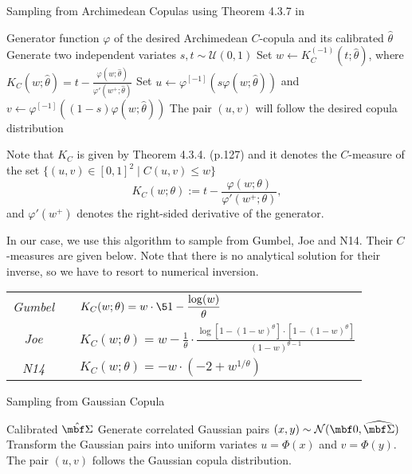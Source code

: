 \begin{algorithm}[H]
\caption{Sampling from Archimedean Copulas using Theorem 4.3.7 in \cite{Nelsen2006}}
\label{alg:sampling_theorem_nelsen}
\begin{algorithmic}[1]
\Require Generator function $\varphi$ of the desired Archimedean $C$-copula and its calibrated $\hat \theta$
\State Generate two independent variates $s,t\sim\mathcal U(0,1)$
\State Set $w \gets K_C^{(-1)}(t;\hat \theta)$, where 
$\displaystyle K_C(w;\hat \theta) = t - \frac{\varphi(w;\hat \theta)}{\varphi'(w^+;\hat \theta)}$
\State Set $u \gets \varphi^{[-1]}(s\varphi(w;\hat \theta))$ and $v \gets \varphi^{[-1]}((1-s)\varphi(w;\hat \theta))$
\Ensure The pair $(u,v)$ will follow the desired copula distribution
\end{algorithmic}
\end{algorithm}
Note that $K_C$ is given by Theorem 4.3.4. (p.127) and it denotes the $C$-measure of the set $\{(u,v)\in [0,1]^2 \mid C(u,v)\leq w\}$
$$
K_C(w; \theta) := t - \frac{\varphi(w; \theta)}{\varphi'(w^+; \theta)},
$$ 
and ${\varphi'(w^+)}$ denotes the right-sided derivative of the generator.

In our case, we use this algorithm to sample from Gumbel, Joe and N14. Their $C$-measures are given  below. Note that there is no analytical solution for their inverse, so we have to resort to numerical inversion.

\vspace{0.2cm}
{\centering
\renewcommand{\arraystretch}{1.8}  
\begin{tabular}{ccp{10cm}}
\textit{Gumbel} && $\displaystyle K_C(w; \theta)=w \cdot \5{1- \frac{\log (w)}{\theta}}$ 
\\
\textit{Joe} && $\displaystyle K_C(w; \theta) = w - \frac{1}{\theta} 
\cdot 
\frac{\log[1-(1-w)^{\theta}] \cdot [1-(1-w)^{\theta}]}
{(1-w)^{\theta-1}}$ 
\\
\textit{N14} && $\displaystyle K_C(w; \theta) = -w \cdot (-2 + w^{1/\theta})$ 
\\
\end{tabular}
\par}


\begin{algorithm}[H]
\label{alg:sampling_gaussian}
\caption{Sampling from Gaussian Copula}
\begin{algorithmic}[1]
\Require Calibrated $\hat{\mbf \Sigma}$ %
\State Generate correlated Gaussian pairs $(x,y)\sim\mathcal N(\mbf 0, \widehat{\mbf \Sigma})$
\State Transform the Gaussian pairs into uniform variates %
$u = \Phi(x)$ and $v = \Phi(y)$.
\Ensure The pair $(u,v)$  follows the Gaussian copula distribution.
\end{algorithmic}
\end{algorithm}

